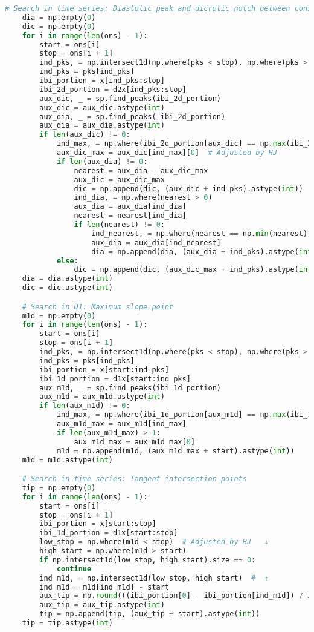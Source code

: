 \begin{lstlisting}[language=Python,label={lst:fidp.py}, basicstyle=\scriptsize]
    # Search in time series: Diastolic peak and dicrotic notch between consecutive onsets
    dia = np.empty(0)
    dic = np.empty(0)
    for i in range(len(ons) - 1):
        start = ons[i]
        stop = ons[i + 1]
        ind_pks, = np.intersect1d(np.where(pks < stop), np.where(pks > start))
        ind_pks = pks[ind_pks]
        ibi_portion = x[ind_pks:stop]
        ibi_2d_portion = d2x[ind_pks:stop]
        aux_dic, _ = sp.find_peaks(ibi_2d_portion)
        aux_dic = aux_dic.astype(int)
        aux_dia, _ = sp.find_peaks(-ibi_2d_portion)
        aux_dia = aux_dia.astype(int)
        if len(aux_dic) != 0:
            ind_max, = np.where(ibi_2d_portion[aux_dic] == np.max(ibi_2d_portion[aux_dic]))
            aux_dic_max = aux_dic[ind_max][0]  # Adjusted by HJ
            if len(aux_dia) != 0:
                nearest = aux_dia - aux_dic_max
                aux_dic = aux_dic_max
                dic = np.append(dic, (aux_dic + ind_pks).astype(int))
                ind_dia, = np.where(nearest > 0)
                aux_dia = aux_dia[ind_dia]
                nearest = nearest[ind_dia]
                if len(nearest) != 0:
                    ind_nearest, = np.where(nearest == np.min(nearest))
                    aux_dia = aux_dia[ind_nearest]
                    dia = np.append(dia, (aux_dia + ind_pks).astype(int))
            else:
                dic = np.append(dic, (aux_dic_max + ind_pks).astype(int))
    dia = dia.astype(int)
    dic = dic.astype(int)

    # Search in D1: Maximum slope point
    m1d = np.empty(0)
    for i in range(len(ons) - 1):
        start = ons[i]
        stop = ons[i + 1]
        ind_pks, = np.intersect1d(np.where(pks < stop), np.where(pks > start))
        ind_pks = pks[ind_pks]
        ibi_portion = x[start:ind_pks]
        ibi_1d_portion = d1x[start:ind_pks]
        aux_m1d, _ = sp.find_peaks(ibi_1d_portion)
        aux_m1d = aux_m1d.astype(int)
        if len(aux_m1d) != 0:
            ind_max, = np.where(ibi_1d_portion[aux_m1d] == np.max(ibi_1d_portion[aux_m1d]))
            aux_m1d_max = aux_m1d[ind_max]
            if len(aux_m1d_max) > 1:
                aux_m1d_max = aux_m1d_max[0]
            m1d = np.append(m1d, (aux_m1d_max + start).astype(int))
    m1d = m1d.astype(int)

    # Search in time series: Tangent intersection points
    tip = np.empty(0)
    for i in range(len(ons) - 1):
        start = ons[i]
        stop = ons[i + 1]
        ibi_portion = x[start:stop]
        ibi_1d_portion = d1x[start:stop]
        low_stop = np.where(m1d < stop)  # Adjusted by HJ   ↓
        high_start = np.where(m1d > start)
        if np.intersect1d(low_stop, high_start).size == 0:
            continue
        ind_m1d, = np.intersect1d(low_stop, high_start)  #  ↑
        ind_m1d = m1d[ind_m1d] - start
        aux_tip = np.round(((ibi_portion[0] - ibi_portion[ind_m1d]) / ibi_1d_portion[ind_m1d]) + ind_m1d)
        aux_tip = aux_tip.astype(int)
        tip = np.append(tip, (aux_tip + start).astype(int))
    tip = tip.astype(int)


\end{lstlisting}
